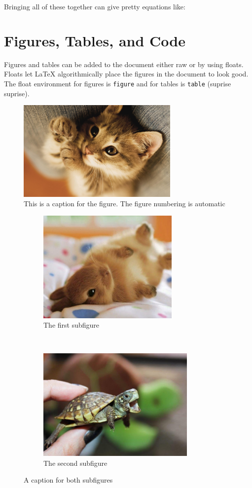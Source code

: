 \documentclass{article}
\begin{document}
Bringing all of these together can give pretty equations like:

\section{Figures, Tables, and Code}

Figures and tables can be added to the document either raw or by using floats. Floats let \LaTeX{} algorithmically place the figures in the document to look good. The float environment for figures is \lstinline{figure} and for tables is \lstinline{table} (suprise suprise). 

\begin{figure}[h!]
    \centering
    \includegraphics[width=0.7\textwidth]{cat.jpg}
    \caption{This is a caption for the figure. The figure numbering is automatic}
\end{figure}

\begin{figure}[h!]
    \centering
    \begin{subfigure}{0.47\textwidth}
        \includegraphics[height=5.5cm]{rabbit.jpg}
        \caption{The first subfigure}
    \end{subfigure}
    ~
    \begin{subfigure}{0.47\textwidth}
        \includegraphics[height=5.5cm]{turtle.jpg}
        \caption{The second subfigure}
    \end{subfigure}
    \caption{A caption for both subfigures}
\end{figure}
\end{document}
